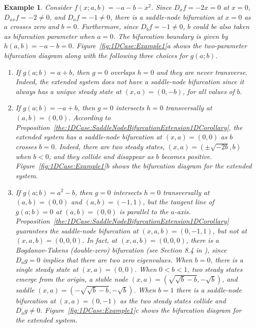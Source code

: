 \documentclass[12pt]{article}
\newtheorem{example}{Example}
\begin{document}
\begin{example}
    \label{exa:1DCase:Example1}
    Consider $f(x;a,b) = -a -b -x^2$. Since $D_{x}f=-2x=0$ at $x=0$, $D_{xx}f=-2\neq0$, and $D_{a}f=-1\neq0$, there is a saddle-node bifurcation at $x=0$ as $a$ crosses zero and $b=0$. Furthermore, since $D_{b}f=-1\neq0$, $b$ could be also taken as bifurcation parameter when $a=0$. The bifurcation boundary is given by $h(a,b)=-a-b=0$.  Figure~\ref{fig:1DCase:Example1}a shows the two-parameter bifurcation diagram along with the following three choices for $g(a;b)$.
    \begin{enumerate}
        \item If $g(a;b) = a+b$, then $g=0$ overlaps $h=0$ and they are never transverse. Indeed, the extended system does not have a saddle-node bifurcation since it always has a unique steady state at $(x,a)=(0,-b)$, for all values of $b$.
        \item If $g(a;b) = -a+b$, then $g=0$ intersects $h=0$ transversally at $(a,b)=(0,0)$. According to Proposition~\ref{the:1DCase:SaddleNodeBifurcationExtension1DCorollary}, the extended system has a saddle-node bifurcation at $(x,a)=(0,0)$ as $b$ crosses $b=0$. Indeed, there are two steady states, $(x,a)=(\pm\sqrt{-2b},b)$ when $b<0$, and they collide and disappear as $b$ becomes positive. Figure~\ref{fig:1DCase:Example1}b shows the bifurcation diagram for the extended system.
        \item If $g(a;b)=a^{2}-b$, then $g=0$ intersects $h=0$ transversally at $(a,b)=(0,0)$ and $(a,b)=(-1,1)$, but the tangent line of $g(a;b)=0$ at $(a,b)=(0,0)$ is parallel to the $a$-axis. Proposition~\ref{the:1DCase:SaddleNodeBifurcationExtension1DCorollary} guarantees the saddle-node bifurcation at $(x,a,b)=(0,-1,1)$, but not at $(x,a,b)=(0,0,0)$. In fact, at $(x,a,b)=(0,0,0)$, there is a Bogdanov-Takens (double-zero) bifurcation (see Section 8.4 in \citet{Kuznetsov2004}), since $D_{a}g=0$ implies that there are two zero eigenvalues. When $b=0$, there is a single steady state at $(x,a)=(0,0)$. When $0<b<1$, two steady states emerge from the origin, a stable node $(x,a)=(\sqrt{\sqrt{b}-b},-\sqrt{b})$, and saddle $(x,a)=(-\sqrt{\sqrt{b}-b},-\sqrt{b})$. When $b=1$ there is a saddle-node bifurcation at $(x,a)=(0,-1)$ as the two steady states collide and $D_{a}g\neq0$. Figure~\ref{fig:1DCase:Example1}c shows the bifurcation diagram for the extended system.
    \end{enumerate}
\end{example}
\end{document}
